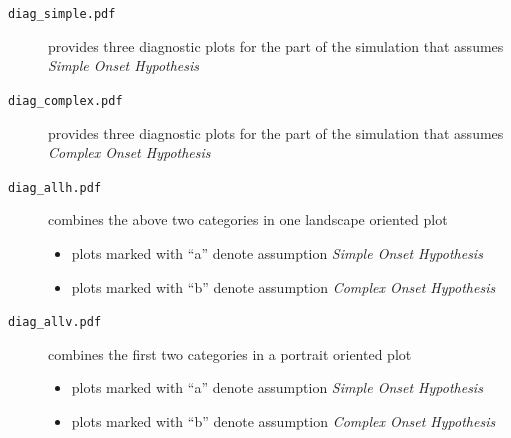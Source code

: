 \documentclass[
draft=false,
toc=graduated,
listof=totoc,
headsepline=true,
]%
{scrartcl}
\begin{document}
\begin{description}
\item[\texttt{diag\_simple.pdf}] provides three diagnostic plots for the part of the simulation that assumes \emph{Simple Onset Hypothesis}
\item[\texttt{diag\_complex.pdf}] provides three diagnostic plots for the part of the simulation that assumes \emph{Complex Onset Hypothesis}
\item[\texttt{diag\_allh.pdf}] combines the above two categories in one landscape oriented plot
\begin{itemize}
\item plots marked with \enquote{a} denote assumption \emph{Simple Onset Hypothesis}
\item plots marked with \enquote{b} denote assumption \emph{Complex Onset Hypothesis}
\end{itemize}
\item[\texttt{diag\_allv.pdf}] combines the first two categories in a portrait oriented plot
\begin{itemize}
\item plots marked with \enquote{a} denote assumption \emph{Simple Onset Hypothesis}
\item plots marked with \enquote{b} denote assumption \emph{Complex Onset Hypothesis}
\end{itemize}
\end{description}
\end{document}
